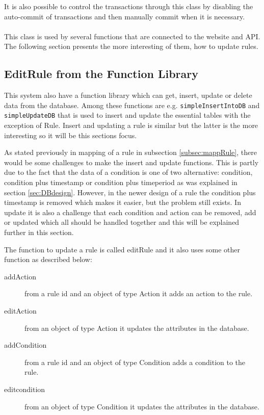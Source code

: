 It is also possible to control the transactions through this class by disabling the auto-commit of transactions and then manually commit when it is necessary. \\\\

This class is used by several functions that are connected to the website and API. The following section presents the more interesting of them, how to update rules. 

\subsection{EditRule from the Function Library}
\label{subsec:dbRule}
This system also have a function library which can get, insert, update or delete data from the database. Among these functions are e.g. \texttt{simpleInsertIntoDB} and \texttt{simpleUpdateDB} that is used to insert and update the essential tables with the exception of Rule. Insert and updating a rule is similar but the latter is the more interesting so it will be this sections focus. 

As stated previously in mapping of a rule in subsection \vref{subsec:mappRule}, there would be some challenges to make the insert and update functions. This is partly due to the fact that the data of a condition  is one of two alternative: condition, condition plus timestamp  or condition plus timeperiod as was explained in section \vref{sec:DBdesign}. However, in the newer design of a rule the condition plus timestamp is removed which makes it easier, but the problem still exists. In update it is also a challenge that each condition and action can be removed, add or updated which all should be handled together and this will be explained further in this section. 

The function to update a rule is called editRule and it also uses some other function as described below:

\begin{description}
	\item[addAction] from a rule id and an object of type Action it adds an action to the rule.
	\item[editAction] from an object of type Action it updates the attributes in the database.   
	\item[addCondition] from a rule id and an object of type Condition adds a condition to the rule.
	\item[editcondition] from an object of type Condition it updates the attributes in the database.   
\end{description}

